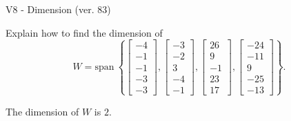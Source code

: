 \begin{exercise}
  \begin{exerciseTitle}V8 - Dimension (ver. 83)\end{exerciseTitle}
  \begin{exerciseStatement}
    Explain how to find the dimension of 
\[W=\mathrm{span}\ \left\{\left[\begin{array}{r}
-4 \\
-1 \\
-1 \\
-3 \\
-3
\end{array}\right] , \left[\begin{array}{r}
-3 \\
-2 \\
3 \\
-4 \\
-1
\end{array}\right] , \left[\begin{array}{r}
26 \\
9 \\
-1 \\
23 \\
17
\end{array}\right] , \left[\begin{array}{r}
-24 \\
-11 \\
9 \\
-25 \\
-13
\end{array}\right]\right\}.\]



  \end{exerciseStatement}
  \begin{exerciseAnswer}
   The dimension of \(W\) is  \(2\).
  


  \end{exerciseAnswer}
\end{exercise}